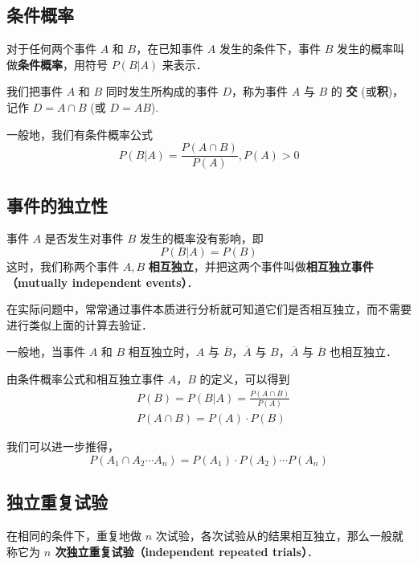 

\subsection{条件概率}
对于任何两个事件 $A$ 和 $B$，在已知事件 $A$ 发生的条件下，事件 $B$ 发生的概率叫做\textbf{条件概率}，用符号 $P(B|A)$ 来表示．

我们把事件 $A$ 和 $B$ 同时发生所构成的事件 $D$，称为事件 $A$ 与 $B$ 的 \textbf{交} (或\textbf{积})，记作 $D = A \cap B$ (或 $D = AB$).

一般地，我们有条件概率公式
\begin{equation}
P(B|A) = \frac{P(A \cap B)}{P(A)},P(A)>0
\end{equation}

\subsection{事件的独立性}
事件 $A$ 是否发生对事件 $B$ 发生的概率没有影响，即
\begin{equation}
P(B|A) = P(B)
\end{equation}
这时，我们称两个事件 $A,B$ \textbf{相互独立}，并把这两个事件叫做\textbf{相互独立事件（mutually independent events）}．

在实际问题中，常常通过事件本质进行分析就可知道它们是否相互独立，而不需要进行类似上面的计算去验证．

一般地，当事件 $A$ 和 $B$ 相互独立时，$A$ 与 $\overline{B}$，$\overline{A}$ 与 $B$，$\overline{A}$ 与 $\overline{B}$ 也相互独立．

由条件概率公式和相互独立事件 $A$，$B$ 的定义，可以得到
\begin{equation}
\begin{aligned}
&P(B) = P(B|A) = \frac{P(A \cap B)}{P(A)} \\
&P(A\cap B) = P(A) \cdot P(B)
\end{aligned}
\end{equation}

我们可以进一步推得，
\begin{equation}
P(A_1\cap A_2 \cdots A_n) = P(A_1) \cdot P(A_2) \cdots P(A_n)
\end{equation}

\subsection{独立重复试验}
在相同的条件下，重复地做 $n$ 次试验，各次试验从的结果相互独立，那么一般就称它为 \textbf{ $n$ 次独立重复试验（independent repeated trials）}．

